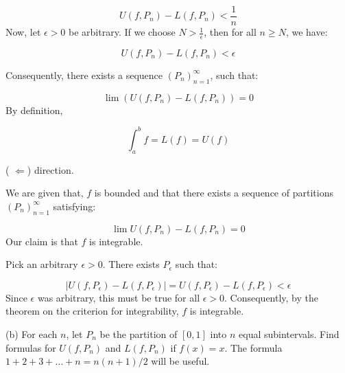 \documentclass[10pt]{article}
\begin{document}
\begin{equation*}
U( f,P_{n}) -L( f,P_{n}) < \frac{1}{n}
\end{equation*}
Now, let $\displaystyle \epsilon  >0$ be arbitrary. If we choose $\displaystyle N >\frac{1}{\epsilon }$, then for all $\displaystyle n\geq N$, we have:


\begin{equation*}
U( f,P_{n}) -L( f,P_{n}) < \epsilon 
\end{equation*}


Consequently, there exists a sequence $\displaystyle ( P_{n})_{n=1}^{\infty }$, such that:


\begin{equation*}
\lim ( U( f,P_{n}) -L( f,P_{n})) =0
\end{equation*}
By definition,




\begin{equation*}
\int _{a}^{b} f=L( f) =U( f)
\end{equation*}


( $\displaystyle \Longleftarrow $) direction.



We are given that, $\displaystyle f$ is bounded and that there exists a sequence of partitions $\displaystyle ( P_{n})_{n=1}^{\infty }$ satisfying:


\begin{equation*}
\lim U( f,P_{n}) -L( f,P_{n}) =0
\end{equation*}
Our claim is that $\displaystyle f$ is integrable.



Pick an arbitrary $\displaystyle \epsilon  >0$. There exists $\displaystyle P_{\epsilon }$ such that:


\begin{equation*}
|U( f,P_{\epsilon }) -L( f,P_{\epsilon }) |=U( f,P_{\epsilon }) -L( f,P_{\epsilon }) < \epsilon 
\end{equation*}
Since $\displaystyle \epsilon $ was arbitrary, this must be true for all $\displaystyle \epsilon  >0$. Consequently, by the theorem on the criterion for integrability, $\displaystyle f$ is integrable.



(b) For each $\displaystyle n$, let $\displaystyle P_{n}$ be the partition of $\displaystyle [ 0,1]$ into $\displaystyle n$ equal subintervals. Find formulas for $\displaystyle U( f,P_{n})$ and $\displaystyle L( f,P_{n})$ if $\displaystyle f( x) =x$. The formula $\displaystyle 1+2+3+\dotsc +n=n( n+1) /2$ will be useful.
\end{document}
